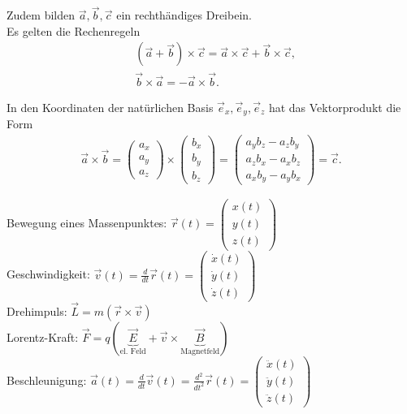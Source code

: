 Zudem bilden $\vec a, \vec b, \vec c$ ein rechthändiges Dreibein.\\
Es gelten die Rechenregeln
\begin{align}
          &(\vec a + \vec b) \times \vec c = \vec a \times \vec c + \vec b
          \times \vec c, \nonumber\\ 
          &\vec b \times \vec a = - \vec a \times \vec b.
\end{align}

In den Koordinaten der natürlichen Basis $\vec e_x, \vec e_y, \vec e_z$ hat das Vektorprodukt die Form
\begin{align}
 \vec a \times \vec b = \begin{pmatrix}a_x\\a_y\\a_z\end{pmatrix} \times
 \begin{pmatrix}b_x\\b_y\\b_z\end{pmatrix} = \begin{pmatrix}a_y b_z - a_z b_y\\a_z b_x - a_x b_z\\ a_x b_y - a_y b_x\end{pmatrix} = \vec c.
\end{align}

\begin{Beispiel}
Bewegung eines Massenpunktes: $\vec r(t) =
\begin{pmatrix}x(t)\\y(t)\\z(t)\end{pmatrix}$\\ Geschwindigkeit: $\vec v(t) = \frac{d}{dt} \vec r(t) =
\begin{pmatrix}\dot{x}(t)\\\dot{y}(t)\\\dot{z}(t)\end{pmatrix}$\\
Drehimpuls: $\vec L = m(\vec r \times \vec v)$\\
Lorentz-Kraft: $\vec F = q(\underbrace{\vec E}_{\text{el. Feld}} + \vec v
\times \underbrace{\vec B}_{\text{Magnetfeld}})$\\
Beschleunigung: $\vec a(t) = \frac{d}{dt} \vec v(t) = \frac{d^2}{dt^2}\vec r(t)
= \begin{pmatrix}\ddot{x}(t)\\\ddot{y}(t)\\\ddot{z}(t)\end{pmatrix}$
\end{Beispiel}